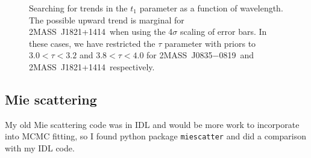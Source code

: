 \documentclass[twocolumn]{aastex6}
\newcommand{\sha}{2MASS~J0835$-$0819}
\newcommand{\shb}{2MASS~J1821+1414}
\begin{document}
\begin{figure}[!t]
\centering
{}
	\caption{Searching for trends in the $t_1$ parameter as a function of wavelength. The possible upward trend is marginal for \shb\ when using the 4$\sigma$ scaling of error bars. In these cases, we have restricted the $\tau$ parameter with priors to $3.0 < \tau < 3.2$ and $3.8 < \tau < 4.0$ for \sha\ and \shb\ respectively.}
	\label{fig:ampSpec0835TauRestrict}
	\vspace{0.1in}
\end{figure} 




\clearpage
\pagebreak
\subsection{Mie scattering}

My old Mie scattering code was in IDL and would be more work to incorporate into MCMC fitting, so I found python package \texttt{miescatter} and did a comparison with my IDL code.
\end{document}
